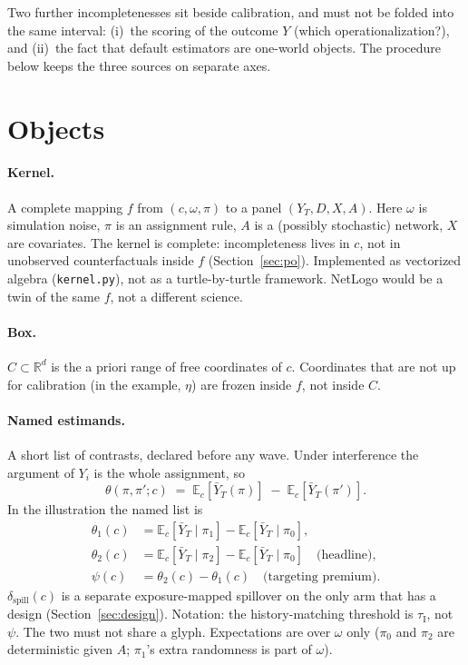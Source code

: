 \documentclass[11pt]{article}
\newcommand{\thr}{\tau_{\mathrm{I}}}
\newcommand{\prem}{\psi}
\begin{document}
Two further incompletenesses sit beside calibration, and must not be
folded into the same interval: (i)~the scoring of the outcome $Y$
(which operationalization?), and (ii)~the fact that default estimators
are one-world objects. The procedure below keeps the three sources on
separate axes.

\section{Objects}

\paragraph{Kernel.}
A complete mapping $f$ from $(c,\omega,\pi)$ to a panel
$(Y_T,D,X,A)$. Here $\omega$ is simulation noise, $\pi$ is an
assignment rule, $A$ is a (possibly stochastic) network, $X$ are
covariates. The kernel is complete: incompleteness lives in $c$, not in
unobserved counterfactuals inside $f$ (Section~\ref{sec:po}).
Implemented as vectorized algebra (\texttt{kernel.py}), not as a
turtle-by-turtle framework. NetLogo would be a twin of the same $f$,
not a different science.

\paragraph{Box.}
$C\subset\mathbb{R}^d$ is the a priori range of free coordinates of
$c$. Coordinates that are not up for calibration (in the example,
$\eta$) are frozen inside $f$, not inside $C$.

\paragraph{Named estimands.}
A short list of contrasts, declared before any wave. Under interference
the argument of $Y_i$ is the whole assignment, so
\begin{equation}
  \theta(\pi,\pi';c)
  \;=\;
  \mathbb{E}_c\!\left[\bar Y_T(\pi)\right]
  \;-\;
  \mathbb{E}_c\!\left[\bar Y_T(\pi')\right].
\end{equation}
In the illustration the named list is
\begin{align}
  \theta_1(c)
  &= \mathbb{E}_c[\bar Y_T\mid\pi_1]-\mathbb{E}_c[\bar Y_T\mid\pi_0],
  \\
  \theta_2(c)
  &= \mathbb{E}_c[\bar Y_T\mid\pi_2]-\mathbb{E}_c[\bar Y_T\mid\pi_0]
  \quad\text{(headline)},
  \\
  \prem(c)
  &= \theta_2(c)-\theta_1(c)
  \quad\text{(targeting premium)}.
\end{align}
$\delta_{\mathrm{spill}}(c)$ is a separate exposure-mapped spillover on
the only arm that has a design (Section~\ref{sec:design}). Notation:
the history-matching threshold is $\thr$, not $\prem$. The two must not
share a glyph. Expectations are over $\omega$ only ($\pi_0$ and $\pi_2$
are deterministic given $A$; $\pi_1$'s extra randomness is part of
$\omega$).
\end{document}
